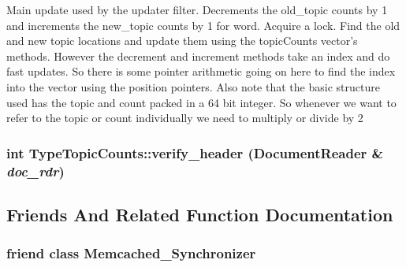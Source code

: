 Main update used by the updater filter. Decrements the old\_\-topic counts by 1 and increments the new\_\-topic counts by 1 for word. Acquire a lock. Find the old and new topic locations and update them using the topicCounts vector's methods. However the decrement and increment methods take an index and do fast updates. So there is some pointer arithmetic going on here to find the index into the vector using the position pointers. Also note that the basic structure used has the topic and count packed in a 64 bit integer. So whenever we want to refer to the topic or count individually we need to multiply or divide by 2 \hypertarget{class_type_topic_counts_adc1724643b2210fce240202fdfc5144c}{
\subsubsection[{verify\_\-header}]{\setlength{\rightskip}{0pt plus 5cm}int TypeTopicCounts::verify\_\-header ({\bf DocumentReader} \& {\em doc\_\-rdr})}}
\label{class_type_topic_counts_adc1724643b2210fce240202fdfc5144c}


\subsection{Friends And Related Function Documentation}
\hypertarget{class_type_topic_counts_a262cd29ee3b1d36569101e365d04b725}{
\subsubsection[{Memcached\_\-Synchronizer}]{\setlength{\rightskip}{0pt plus 5cm}friend class Memcached\_\-Synchronizer}}
\label{class_type_topic_counts_a262cd29ee3b1d36569101e365d04b725}


